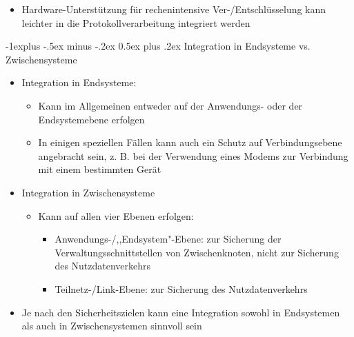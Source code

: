 \documentclass[a4paper]{article}
\makeatletter
\renewcommand{\subsection}{\@startsection{subsection}{2}{0mm}%
 {-1explus -.5ex minus -.2ex}%
 {0.5ex plus .2ex}%
 {\normalfont\normalsize\bfseries}}
\makeatother
\begin{document}
\begin{multicols}{3}
\begin{itemize}
\begin{itemize}
                        \begin{itemize}
                            \item
                                  Hardware-Unterstützung für rechenintensive Ver-/Entschlüsselung
                                  kann leichter in die Protokollverarbeitung integriert werden
                        \end{itemize}
              \end{itemize}
    \end{itemize}


    \subsection{Integration in Endsysteme vs.
        Zwischensysteme}

    \begin{itemize}
        \item
              Integration in Endsysteme:

              \begin{itemize}
                  \item
                        Kann im Allgemeinen entweder auf der Anwendungs- oder der
                        Endsystemebene erfolgen
                  \item
                        In einigen speziellen Fällen kann auch ein Schutz auf
                        Verbindungsebene angebracht sein, z. B. bei der Verwendung eines
                        Modems zur Verbindung mit einem bestimmten Gerät
              \end{itemize}
        \item
              Integration in Zwischensysteme

              \begin{itemize}
                  \item
                        Kann auf allen vier Ebenen erfolgen:

                        \begin{itemize}
                            \item
                                  Anwendungs-/,,Endsystem"-Ebene: zur Sicherung der
                                  Verwaltungsschnittstellen von Zwischenknoten, nicht zur Sicherung
                                  des Nutzdatenverkehrs
                            \item
                                  Teilnetz-/Link-Ebene: zur Sicherung des Nutzdatenverkehrs
                        \end{itemize}
              \end{itemize}
        \item
              Je nach den Sicherheitszielen kann eine Integration sowohl in
              Endsystemen als auch in Zwischensystemen sinnvoll sein
    \end{itemize}



\end{multicols}
\end{document}
